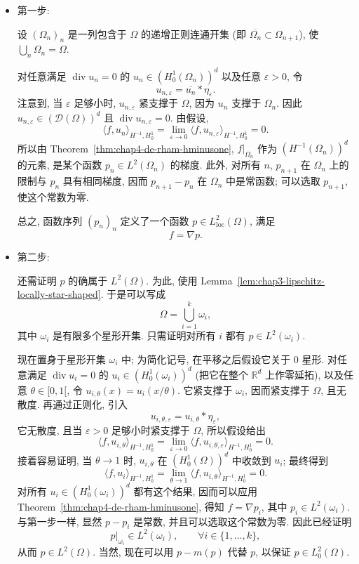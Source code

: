 \begin{Proof}
\begin{itemize}
 \item 第一步:

 设 $(\Omega_n)_n$ 是一列包含于 $\Omega$ 的递增正则连通开集 (即 $\overline{\Omega_n}\subset\Omega_{n+1}$), 使 $\bigcup_n\Omega_n=\Omega$.

 对任意满足 $\operatorname{div}u_n=0$ 的 $u_n\in(H_0^1(\Omega_n))^d$ 以及任意 $\varepsilon>0$, 令
 \[
  u_{n,\varepsilon}=\overline{u_n}*\eta_\varepsilon.
 \]
 注意到, 当 $\varepsilon$ 足够小时, $u_{n,\varepsilon}$ 紧支撑于 $\Omega$, 因为 $u_n$ 支撑于 $\Omega_n$. 因此 $u_{n,\varepsilon}\in(\mathcal D(\Omega))^d$ 且 $\operatorname{div}u_{n,\varepsilon}=0$. 由假设,
 \[
  \langle f,u_n\rangle_{H^{-1},H_0^1}
  =\lim_{\varepsilon\to0}\langle f,u_{n,\varepsilon}\rangle_{H^{-1},H_0^1}=0.
 \]
 所以由 Theorem~\ref{thm:chap4-de-rham-hminusone}, $f|_{\Omega_n}$ 作为 $(H^{-1}(\Omega_n))^d$ 的元素, 是某个函数 $p_n\in L^2(\Omega_n)$ 的梯度. 此外, 对所有 $n$, $p_{n+1}$ 在 $\Omega_n$ 上的限制与 $p_n$ 具有相同梯度, 因而 $p_{n+1}-p_n$ 在 $\Omega_n$ 中是常函数; 可以选取 $p_{n+1}$, 使这个常数为零.

 总之, 函数序列 $(p_n)_n$ 定义了一个函数 $p\in L_{\mathrm{loc}}^2(\Omega)$, 满足
 \[
  f=\nabla p.
 \]

 \item 第二步:

 还需证明 $p$ 的确属于 $L^2(\Omega)$. 为此, 使用 Lemma~\ref{lem:chap3-lipschitz-locally-star-shaped}. 于是可以写成
 \[
  \Omega=\bigcup_{i=1}^k\omega_i,
 \]
 其中 $\omega_i$ 是有限多个星形开集. 只需证明对所有 $i$ 都有 $p\in L^2(\omega_i)$.

 现在置身于星形开集 $\omega_i$ 中; 为简化记号, 在平移之后假设它关于 $0$ 星形. 对任意满足 $\operatorname{div}u_i=0$ 的 $u_i\in(H_0^1(\omega_i))^d$ (把它在整个 $\mathbb R^d$ 上作零延拓), 以及任意 $\theta\in[0,1[$, 令 $u_{i,\theta}(x)=u_i(x/\theta)$. 它紧支撑于 $\omega_i$, 因而紧支撑于 $\Omega$, 且无散度. 再通过正则化, 引入
 \[
  u_{i,\theta,\varepsilon}=u_{i,\theta}*\eta_\varepsilon,
 \]
 它无散度, 且当 $\varepsilon>0$ 足够小时紧支撑于 $\Omega$, 所以假设给出
 \[
  \langle f,u_{i,\theta}\rangle_{H^{-1},H_0^1}
  =\lim_{\varepsilon\to0}\langle f,u_{i,\theta,\varepsilon}\rangle_{H^{-1},H_0^1}=0.
 \]
 接着容易证明, 当 $\theta\to1$ 时, $u_{i,\theta}$ 在 $(H_0^1(\Omega))^d$ 中收敛到 $u_i$; 最终得到
 \[
  \langle f,u_i\rangle_{H^{-1},H_0^1}
  =\lim_{\theta\to1}\langle f,u_{i,\theta}\rangle_{H^{-1},H_0^1}=0.
 \]
 对所有 $u_i\in(H_0^1(\omega_i))^d$ 都有这个结果, 因而可以应用 Theorem~\ref{thm:chap4-de-rham-hminusone}, 得知 $f=\nabla p_i$, 其中 $p_i\in L^2(\omega_i)$. 与第一步一样, 显然 $p-p_i$ 是常数, 并且可以选取这个常数为零. 因此已经证明
 \[
  p|_{\omega_i}\in L^2(\omega_i),
  \qquad\forall i\in\{1,\ldots,k\},
 \]
 从而 $p\in L^2(\Omega)$. 当然, 现在可以用 $p-m(p)$ 代替 $p$, 以保证 $p\in L_0^2(\Omega)$.
\end{itemize}
\end{Proof}

